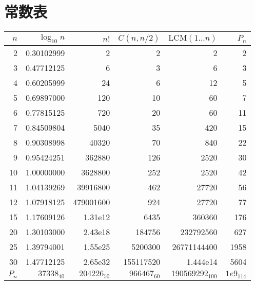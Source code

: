 \section{常数表}
\begin{center}
    \begin{tabular}{|r|r|r|r|r|r|}  
        \hline
        \rowcolor{gray!20}
        $n$         & $\log_{10}n$  & $n!$          & $C(n,n/2)$    & $\mathrm{LCM}(1...n)$ & $P_n$         \\ \hline  
        2           & 0.30102999    & 2             & 2             & 2                     & 2             \\ \hline 
        3           & 0.47712125    & 6             & 3             & 6                     & 3             \\ \hline 
        4           & 0.60205999    & 24            & 6             & 12                    & 5             \\ \hline 
        5           & 0.69897000    & 120           & 10            & 60                    & 7             \\ \hline 
        6           & 0.77815125    & 720           & 20            & 60                    & 11            \\ \hline 
        7           & 0.84509804    & 5040          & 35            & 420                   & 15            \\ \hline 
        8           & 0.90308998    & 40320         & 70            & 840                   & 22            \\ \hline 
        9           & 0.95424251    & 362880        & 126           & 2520                  & 30            \\ \hline 
        10          & 1.00000000    & 3628800       & 252           & 2520                  & 42            \\ \hline 
        11          & 1.04139269    & 39916800      & 462           & 27720                 & 56            \\ \hline 
        12          & 1.07918125    & 479001600     & 924           & 27720                 & 77            \\ \hline 
        15          & 1.17609126    & 1.31e12       & 6435          & 360360                & 176           \\ \hline 
        20          & 1.30103000    & 2.43e18       & 184756        & 232792560             & 627           \\ \hline 
        25          & 1.39794001    & 1.55e25       & 5200300       & 26771144400           & 1958          \\ \hline 
        30          & 1.47712125    & 2.65e32       & 155117520     & 1.444e14              & 5604          \\ \hline 
        $P_n$       & $37338_{40}$  & $204226_{50}$ & $966467_{60}$ & $190569292_{100}$     & $1e9_{114}$   \\ \hline 
    \end{tabular}\\
\end{center}
